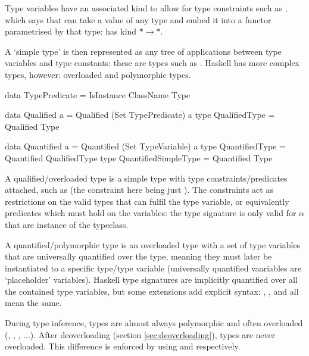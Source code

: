 \documentclass[dissertation.tex]{subfiles}
\begin{document}
{{        Type variables have an associated kind to allow for type constraints such as , which says that  can take a value of any type and embed it into
        a functor parametrised by that type:  has kind \(*\rightarrow*\).

        A `simple type' is then represented as any tree of applications between type variables and type constants: these
        are types such as . Haskell has more complex types, however: overloaded and
        polymorphic types.

        \begin{haskellfigure}
        data TypePredicate = IsInstance ClassName Type

        data Qualified a = Qualified (Set TypePredicate) a
        type QualifiedType = Qualified Type

        data Quantified a = Quantified (Set TypeVariable) a
        type QuantifiedType = Quantified QualifiedType
        type QuantifiedSimpleType = Quantified Type
        \end{haskellfigure}

        A qualified/overloaded type is a simple type with type constraints/predicates attached, such as  (the constraint here being just ). The constraints act as restrictions on the valid types that can fulfil the type variable, or
        equivalently predicates which must hold on the variables: the type signature is only valid for \(\alpha\) that
        are instance of the  typeclass.
        
        A quantified/polymorphic type is an overloaded type with a set of type variables that are universally quantified
        over the type, meaning they must later be instantiated to a specific type/type variable (universally quantified
        vaariables are `placeholder' variables). Haskell type signatures are implicitly quantified over all the
        contained type variables, but some extensions add explicit syntax: , , and
         all mean the same.

        During type inference, types are almost always polymorphic and often overloaded (, , , ...). After deoverloading (section \ref{sec:deoverloading}), types are never
        overloaded. This difference is enforced by using  and 
        respectively.

}}
\end{document}
